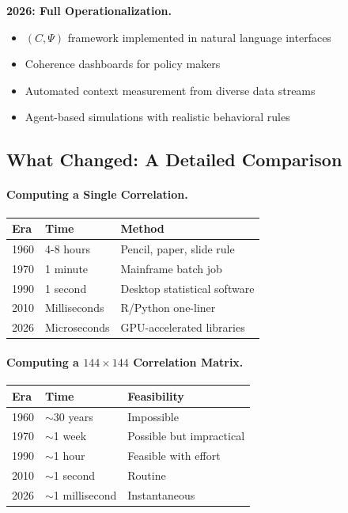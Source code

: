 \documentclass[12pt,a4paper]{article}
\begin{document}
\textbf{2026: Full Operationalization.}
\begin{itemize}
  \item $(C, \Psi)$ framework implemented in natural language interfaces
  \item Coherence dashboards for policy makers
  \item Automated context measurement from diverse data streams
  \item Agent-based simulations with realistic behavioral rules
\end{itemize}

\subsection{What Changed: A Detailed Comparison}

\paragraph{Computing a Single Correlation.}
\begin{center}
\renewcommand{\arraystretch}{1.3}
\begin{tabular}{lll}
\hline
\textbf{Era} & \textbf{Time} & \textbf{Method} \\
\hline
1960 & 4-8 hours & Pencil, paper, slide rule \\
1970 & 1 minute & Mainframe batch job \\
1990 & 1 second & Desktop statistical software \\
2010 & Milliseconds & R/Python one-liner \\
2026 & Microseconds & GPU-accelerated libraries \\
\hline
\end{tabular}
\end{center}

\paragraph{Computing a $144 \times 144$ Correlation Matrix.}
\begin{center}
\renewcommand{\arraystretch}{1.3}
\begin{tabular}{lll}
\hline
\textbf{Era} & \textbf{Time} & \textbf{Feasibility} \\
\hline
1960 & $\sim$30 years & Impossible \\
1970 & $\sim$1 week & Possible but impractical \\
1990 & $\sim$1 hour & Feasible with effort \\
2010 & $\sim$1 second & Routine \\
2026 & $\sim$1 millisecond & Instantaneous \\
\hline
\end{tabular}
\end{center}
\end{document}
